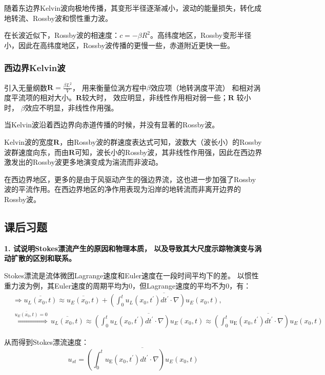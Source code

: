 \documentclass{article}
\begin{document}
随着东边界Kelvin波向极地传播，其变形半径逐渐减小，波动的能量损失，转化成地转流、Rossby波和惯性重力波。

在长波近似下，Rossby波的相速度：$c=-\beta R^2$。高纬度地区，Rossby变形半径小，因此在高纬度地区，Rossby波传播的更慢一些，赤道附近更快一些。

\subsubsection{西边界Kelvin波}
引入无量纲数$\mathbf{R}=\frac{\beta L^2}{V}$，
用来衡量位涡方程中$\beta$效应项（地转涡度平流）
和相对涡度平流项的相对大小。$\mathbf{R}$较大时， 
效应明显，非线性作用相对弱一些；$\mathbf{R}$ 较小时，
$\beta$效应不明显，非线性作用强。

当Kelvin波沿着西边界向赤道传播的时候，并没有显著的Rossby波。

Kelvin波的宽度$\mathbf{R}$，由Rossby波的群速度表达式可知，波数大（波长小）的Rossby波群速度向东，而由$\mathbf{R}$可知，波长小的Rossby波，其非线性作用强，因此在西边界激发出的Rossby波更多地演变成为湍流而非波动。

在西边界地区，更多的是由于风驱动产生的强边界流，这也进一步加强了Rossby波的平流作用。在西边界地区的净作用表现为沿岸的地转流而非离开边界的Rossby波。

\subsection{课后习题}
\textbf{1. 试说明Stokes漂流产生的原因和物理本质，
以及导致其大尺度示踪物演变与涡动扩散的区别和联系。}

Stokes漂流是流体微团Lagrange速度和Euler速度在一段时间平均下的差。
以惯性重力波为例，其Euler速度的周期平均为0，但Lagrange速度的平均不为0，有：
\begin{align}
   & \Rightarrow \overline{{{u}_{L}}({{x}_{0}},t)}
   \approx \overline{{{u}_{E}}({{x}_{0}},t)}
   +\overline{(\int_{0}^{t}{{{u}_{L}}({{x}_{0}},t^{\prime})}dt^{\prime}\cdot \nabla ){{u}_{E}}({{x}_{0}},t)}, \\ 
   & \overset{\overline{{{u}_{E}}({{x}_{0}},t)}=0}{\mathop{\Rightarrow }}\,\overline{{{u}_{L}}({{x}_{0}},t)}\approx
    \overline{(\int_{0}^{t}{{{u}_{L}}({{x}_{0}},t^{\prime})}dt^{\prime}\cdot \nabla ){{u}_{E}}({{x}_{0}},t)}\approx 
    \overline{(\int_{0}^{t}{{{u}_{\text{E}}}({{x}_{0}},t^{\prime})}dt^{\prime}\cdot \nabla ){{u}_{E}}({{x}_{0}},t)}
\end{align}

从而得到Stokes漂流速度：
$$u_{st}=\overline{(\int_{0}^{t}{{{u}_{\text{E}}}({{x}_{0}},t^{\prime})}dt^{\prime}\cdot \nabla ){{u}_{E}}({{x}_{0}},t)}$$
\end{document}
